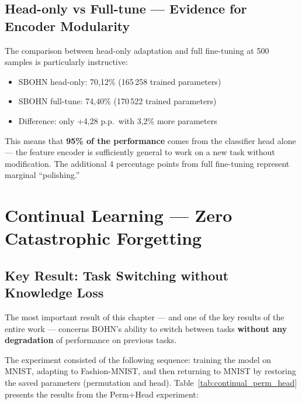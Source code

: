 \documentclass[11pt,a4paper]{report}
\begin{document}
\subsection{Head-only vs Full-tune --- Evidence for Encoder Modularity}

The comparison between head-only adaptation and full fine-tuning at 500 samples is particularly instructive:

\begin{itemize}
    \item SBOHN head-only: 70{,}12\% (165\,258 trained parameters)
    \item SBOHN full-tune: 74{,}40\% (170\,522 trained parameters)
    \item Difference: only +4{,}28 p.p.\ with 3{,}2\% more parameters
\end{itemize}

This means that \textbf{95\% of the performance} comes from the classifier head alone --- the feature encoder is sufficiently general to work on a new task without modification. The additional 4 percentage points from full fine-tuning represent marginal ``polishing.''


\section{Continual Learning --- Zero Catastrophic Forgetting}
\label{sec:continual}

\subsection{Key Result: Task Switching without Knowledge Loss}

The most important result of this chapter --- and one of the key results of the entire work --- concerns BOHN's ability to switch between tasks \textbf{without any degradation} of performance on previous tasks.

The experiment consisted of the following sequence: training the model on MNIST, adapting to Fashion-MNIST, and then returning to MNIST by restoring the saved parameters (permutation and head). Table~\ref{tab:continual_perm_head} presents the results from the Perm+Head experiment:
\end{document}
